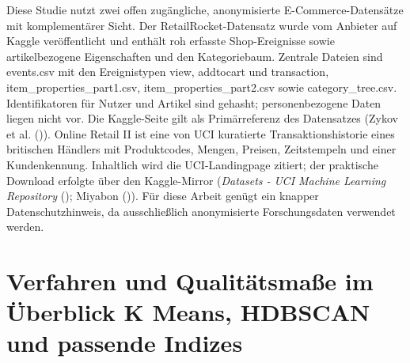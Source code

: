 \documentclass[
  11pt,
  openany, oneside]{book}
\begin{document}
Diese Studie nutzt zwei offen zugängliche, anonymisierte
E-Commerce-Datensätze mit komplementärer Sicht. Der
RetailRocket-Datensatz wurde vom Anbieter auf Kaggle veröffentlicht und
enthält roh erfasste Shop-Ereignisse sowie artikelbezogene Eigenschaften
und den Kategoriebaum. Zentrale Dateien sind events.csv mit den
Ereignistypen view, addtocart und transaction,
item\_properties\_part1.csv, item\_properties\_part2.csv sowie
category\_tree.csv. Identifikatoren für Nutzer und Artikel sind gehasht;
personenbezogene Daten liegen nicht vor. Die Kaggle-Seite gilt als
Primärreferenz des Datensatzes (Zykov et al.
()). Online
Retail II ist eine von UCI kuratierte Transaktionshistorie eines
britischen Händlers mit Produktcodes, Mengen, Preisen, Zeitstempeln und
einer Kundenkennung. Inhaltlich wird die UCI-Landingpage zitiert; der
praktische Download erfolgte über den Kaggle-Mirror (\emph{Datasets -
UCI Machine Learning Repository}
(); Miyabon
()). Für diese
Arbeit genügt ein knapper Datenschutzhinweis, da ausschließlich
anonymisierte Forschungsdaten verwendet werden.

\section{Verfahren und Qualitätsmaße im Überblick K Means, HDBSCAN und
passende Indizes}\label{sec-verfahren-qualitaet}
\end{document}
